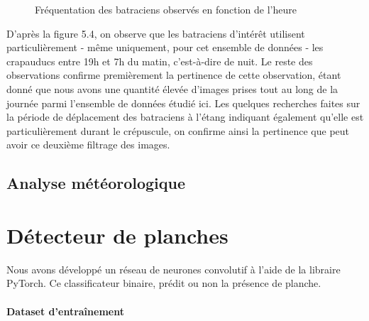 \begin{figure}[!htb]
    \centering
    \caption{Fréquentation des batraciens observés en fonction de l'heure}
    \label{fig:Fréquentation des crapauducs en fonction de l'heure}
\end{figure}

\noindent D'après la figure 5.4, on observe que les batraciens d'intérêt utilisent particulièrement - même uniquement, pour cet ensemble de données - les crapauducs entre 19h et 7h du matin, c'est-à-dire de nuit. Le reste des observations confirme premièrement la pertinence de cette observation, étant donné que nous avons une quantité élevée d'images prises tout au long de la journée parmi l'ensemble de données étudié ici.\newline
Les quelques recherches faites sur la période de déplacement des batraciens à l'étang indiquant également qu'elle est particulièrement durant le crépuscule, on confirme ainsi la pertinence que peut avoir ce deuxième filtrage des images.


\subsection{Analyse météorologique}







\section{Détecteur de planches}

Nous avons développé un réseau de neurones convolutif à l'aide de la libraire PyTorch. Ce classificateur binaire, prédit ou non la présence de planche.

\paragraph*{Dataset d'entraînement}

